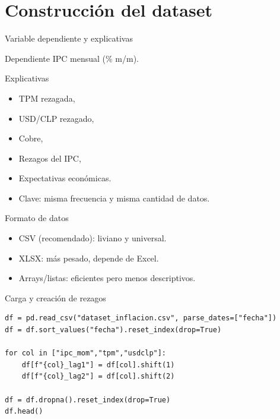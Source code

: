 \documentclass[aspectratio=169,10pt]{beamer}
\begin{document}

\section{Construcción del dataset}

\begin{frame}{Variable dependiente y explicativas}
  \begin{block}{Dependiente}
    IPC mensual (\% m/m).
  \end{block}
  \begin{block}{Explicativas}
    \begin{itemize}
      \item TPM rezagada,
      \item USD/CLP rezagado,
      \item Cobre,
      \item Rezagos del IPC,
      \item Expectativas económicas.
    \end{itemize}
  \end{block}
  \begin{itemize}
    \item Clave: misma frecuencia y misma cantidad de datos.
  \end{itemize}
\end{frame}

\begin{frame}[fragile]{Formato de datos}
\begin{itemize}
  \item CSV (recomendado): liviano y universal.
  \item XLSX: más pesado, depende de Excel.
  \item Arrays/listas: eficientes pero menos descriptivos.
\end{itemize}
\end{frame}

\begin{frame}[fragile]{Carga y creación de rezagos}
\begin{lstlisting}
df = pd.read_csv("dataset_inflacion.csv", parse_dates=["fecha"])
df = df.sort_values("fecha").reset_index(drop=True)

for col in ["ipc_mom","tpm","usdclp"]:
    df[f"{col}_lag1"] = df[col].shift(1)
    df[f"{col}_lag2"] = df[col].shift(2)

df = df.dropna().reset_index(drop=True)
df.head()
\end{lstlisting}
\end{frame}
\end{document}
